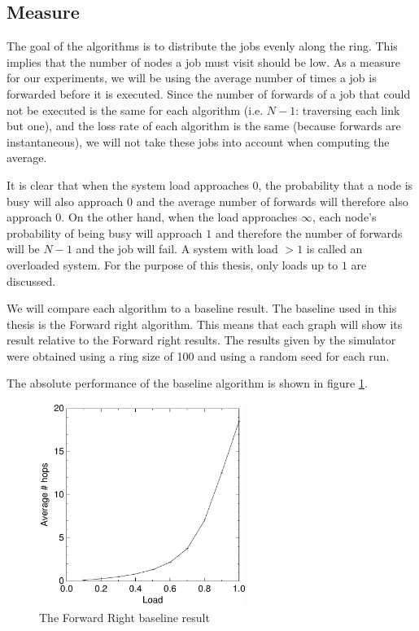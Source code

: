 \documentclass[10pt,a4paper]{article}
\begin{document}
\subsection{Measure}
The goal of the algorithms is to distribute the jobs evenly along the ring. This implies that the number of nodes a job must visit should be low. As a measure for our experiments, we will be using the average number of times a job is forwarded before it is executed. Since the number of forwards of a job that could not be executed is the same for each algorithm (i.e. $N-1$: traversing each link but one), and the loss rate of each algorithm is the same (because forwards are instantaneous), we will not take these jobs into account when computing the average.

It is clear that when the system load approaches $0$, the probability that a node is busy will also approach $0$ and the average number of forwards will therefore also approach $0$. On the other hand, when the load approaches $\infty$, each node's probability of being busy will approach $1$ and therefore the number of forwards will be $N-1$ and the job will fail. A system with load $> 1$ is called an overloaded system. For the purpose of this thesis, only loads up to $1$ are discussed.

We will compare each algorithm to a baseline result. The baseline used in this thesis is the Forward right algorithm. This means that each graph will show its result relative to the Forward right results. The results given by the simulator were obtained using a ring size of 100 and using a random seed for each run.

The absolute performance of the baseline algorithm is shown in figure \ref{baseline}.

\begin{figure}[h!tb]
\centering
\includegraphics[width=0.6\textwidth]{data/right.pdf}
\caption{The Forward Right baseline result}
\label{baseline}
\end{figure}
\end{document}
